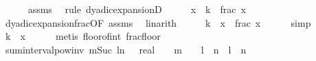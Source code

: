 \begin{isabellebody}
\ \ \ \ \isamarkupfalse%
\ assms\ \isamarkupfalse%
\ {\isacharparenleft}{\kern0pt}rule\ dyadic{\isacharunderscore}{\kern0pt}expansionD{\isacharparenleft}{\kern0pt}{}{\isacharparenright}{\kern0pt}{\isacharparenright}{\kern0pt}\isanewline
\ \ \isamarkupfalse%
\ \isamarkupfalse%
\ {\isachardoublequoteopen}x\ {\isacharequal}{\kern0pt}\ k\ {\isacharplus}{\kern0pt}\ frac\ x{\isachardoublequoteclose}\isanewline
\ \ \ \ \isamarkupfalse%
\ dyadic{\isacharunderscore}{\kern0pt}expansion{\isacharunderscore}{\kern0pt}frac{\isacharbrackleft}{\kern0pt}OF\ assms{\isacharbrackright}{\kern0pt}\ \isamarkupfalse%
\ linarith\isanewline
\ \ \isamarkupfalse%
\ \isamarkupfalse%
\ {\isachardoublequoteopen}k\ {\isacharequal}{\kern0pt}\ x\ {\isacharminus}{\kern0pt}\ frac\ x{\isachardoublequoteclose}\isanewline
\ \ \ \ \isamarkupfalse%
\ simp\isanewline
\ \ \isamarkupfalse%
\ \isamarkupfalse%
\ {\isachardoublequoteopen}k\ {\isacharequal}{\kern0pt}\ {\isasymlfloor}x{\isasymrfloor}{\isachardoublequoteclose}\isanewline
\ \ \ \ \isamarkupfalse%
\ {\isacharparenleft}{\kern0pt}metis\ floor{\isacharunderscore}{\kern0pt}of{\isacharunderscore}{\kern0pt}int\ frac{\isacharunderscore}{\kern0pt}floor{\isacharparenright}{\kern0pt}\isanewline
{}\isamarkupfalse%
%
\endisatagproof
{\isafoldproof}%
%
\isadelimproof
\isanewline
%
\endisadelimproof
\isanewline
{}\isamarkupfalse%
\ sum{\isacharunderscore}{\kern0pt}interval{\isacharunderscore}{\kern0pt}pow{}{\isacharunderscore}{\kern0pt}inv{\isacharcolon}{\kern0pt}\ {\isachardoublequoteopen}{\isacharparenleft}{\kern0pt}{\isasymSum}m{\isasymin}{\isacharbraceleft}{\kern0pt}Suc\ l{\isachardot}{\kern0pt}{\isachardot}{\kern0pt}n{\isacharbraceright}{\kern0pt}{\isachardot}{\kern0pt}\ {\isacharparenleft}{\kern0pt}{}\ {\isacharcolon}{\kern0pt}{\isacharcolon}{\kern0pt}\ real{\isacharparenright}{\kern0pt}\ {\isacharslash}{\kern0pt}\ {}\ {\isacharcircum}{\kern0pt}\ m{\isacharparenright}{\kern0pt}\ {\isacharequal}{\kern0pt}\ {}\ {\isacharslash}{\kern0pt}\ {}{\isacharcircum}{\kern0pt}l\ {\isacharminus}{\kern0pt}\ {}{\isacharslash}{\kern0pt}{}{\isacharcircum}{\kern0pt}n{\isachardoublequoteclose}\ \ {\isachardoublequoteopen}l\ {\isacharless}{\kern0pt}\ n{\isachardoublequoteclose}\isanewline
%
\isadelimproof
\ \ %
\endisadelimproof
%
\isatagproof

\end{isabellebody}
